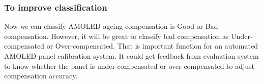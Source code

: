 \documentclass[runningheads]{llncs}
\begin{document}
\subsubsection{To improve classification}
Now we can classify AMOLED ageing compensation is Good or Bad compensation. However, it will be great to classify bad compensation as Under-compensated or Over-compensated. That is important function for an automated AMOLED panel calibration system. It could get feedback from evaluation system to know whether the panel is under-compensated or over-compensated to adjust compensation accuracy.
%
%
%
% 
% 
%


\end{document}
